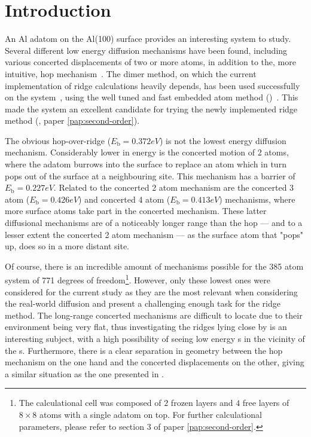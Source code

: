 \section{Introduction}
\label{sec:al-introduction}
An Al adatom on the Al(100) surface provides an interesting system to study.
Several different low energy diffusion mechanisms have been found, including various concerted displacements of two or more atoms, in addition to the, more intuitive, hop mechanism~\cite{concerted-motion-1990, dimer-original-1999, ts-opt-2001}.
The dimer method, on which the current implementation of ridge calculations heavily depends, has been used successfully on the system~\cite{dimer-original-1999}, using the well tuned and fast embedded atom method ()~\cite{eam-1983, eam-1986}.
This made the system an excellent candidate for trying the newly implemented ridge method (, paper \ref{pap:second-order}).


The obvious hop-over-ridge ($E_\text{b} = 0.372\unit{eV}$) is not the lowest energy diffusion mechanism.
Considerably lower in energy is the concerted motion of 2 atoms, where the adatom burrows into the surface to replace an atom which in turn pops out of the surface at a neighbouring site.
This mechanism has a barrier of $E_\text{b} = 0.227\unit{eV}$.
Related to the concerted 2 atom mechanism are the concerted 3 atom ($E_\text{b} = 0.426\unit{eV}$) and concerted 4 atom ($E_\text{b} = 0.413\unit{eV}$) mechanisms, where more surface atoms take part in the concerted mechanism.
These latter diffusional mechanisms are of a noticeably longer range than the hop --- and to a lesser extent the concerted 2 atom mechanism --- as the surface atom that "pops" up, does so in a more distant site.

Of course, there is an incredible amount of mechanisms possible for the 385 atom system of 771 degrees of freedom\footnote{The calculational cell was composed of $2$ frozen layers and $4$ free layers of $8\times 8$ atoms with a single adatom on top. For further calculational parameters, please refer to section 3 of paper \ref{pap:second-order}.}.
However, only these lowest ones were considered for the current study as they are the most relevant when considering the real-world diffusion and present a challenging enough task for the ridge method.
The long-range concerted mechanisms are difficult to locate due to their environment being very flat, thus investigating the ridges lying close by is an interesting subject, with a high possibility of seeing low energy s in the vicinity of the s.
Furthermore, there is a clear separation in geometry between the hop mechanism on the one hand and the concerted displacements on the other, giving a similar situation as the one presented in .
